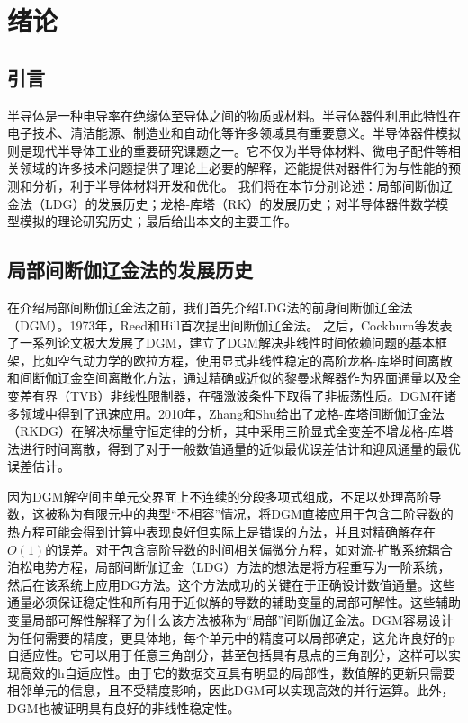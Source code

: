 \cleardoublepage

\section{绪论}

\subsection{引言}
半导体是一种电导率在绝缘体至导体之间的物质或材料。半导体器件利用此特性在电子技术、清洁能源、制造业和自动化等许多领域具有重要意义。半导体器件模拟则是现代半导体工业的重要研究课题之一。它不仅为半导体材料、微电子配件等相关领域的许多技术问题提供了理论上必要的解释，还能提供对器件行为与性能的预测和分析，利于半导体材料开发和优化。
我们将在本节分别论述：局部间断伽辽金法（LDG）的发展历史；龙格-库塔（RK）的发展历史；对半导体器件数学模型模拟的理论研究历史；最后给出本文的主要工作。
\subsection{局部间断伽辽金法的发展历史}
在介绍局部间断伽辽金法之前，我们首先介绍LDG法的前身间断伽辽金法（DGM）。1973年，Reed和Hill首次提出间断伽辽金法\cite{reed1973triangular}。
之后，Cockburn等发表了一系列论文极大发展了DGM，建立了DGM解决非线性时间依赖问题的基本框架\cite{reed1973triangular,cockburn1991runge,cockburn1989tvb2,cockburn1989tvb3,cockburn1990runge,cockburn1998runge}，比如空气动力学的欧拉方程，使用显式非线性稳定的高阶龙格-库塔时间离散和间断伽辽金空间离散化方法，通过精确或近似的黎曼求解器作为界面通量以及全变差有界（TVB）非线性限制器，在强激波条件下取得了非振荡性质。DGM在诸多领域中得到了迅速应用\cite{cockburn2000development}。2010年，Zhang和Shu给出了龙格-库塔间断伽辽金法（RKDG）在解决标量守恒定律的分析，其中采用三阶显式全变差不增龙格-库塔法进行时间离散，得到了对于一般数值通量的近似最优误差估计和迎风通量的最优误差估计\cite{zhang2010stabilitya}。

因为DGM解空间由单元交界面上不连续的分段多项式组成，不足以处理高阶导数，这被称为有限元中的典型“不相容”情况，将DGM直接应用于包含二阶导数的热方程可能会得到计算中表现良好但实际上是错误的方法，并且对精确解存在$O(1)$的误差\cite{cockburn2001runge,zhang2003analysis}。对于包含高阶导数的时间相关偏微分方程，如对流-扩散系统耦合泊松电势方程，局部间断伽辽金（LDG）方法的想法是将方程重写为一阶系统，然后在该系统上应用DG方法。这个方法成功的关键在于正确设计数值通量。这些通量必须保证稳定性和所有用于近似解的导数的辅助变量的局部可解性。这些辅助变量局部可解性解释了为什么该方法被称为“局部”间断伽辽金法\cite{cockburn1998local}。DGM容易设计为任何需要的精度，更具体地，每个单元中的精度可以局部确定，这允许良好的p自适应性。它可以用于任意三角剖分，甚至包括具有悬点的三角剖分，这样可以实现高效的h自适应性。由于它的数据交互具有明显的局部性，数值解的更新只需要相邻单元的信息，且不受精度影响，因此DGM可以实现高效的并行运算。此外，DGM也被证明具有良好的非线性稳定性。

